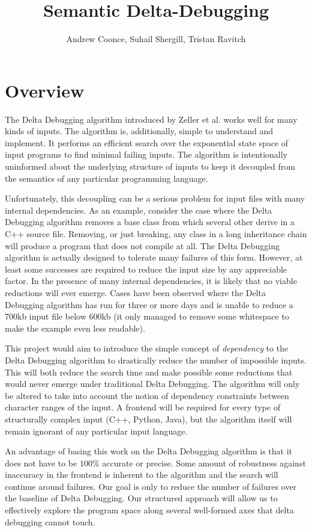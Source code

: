 \documentclass[11pt]{article}
\title{Semantic Delta-Debugging}
\author{
Andrew Coonce, Suhail Shergill, Tristan Ravitch\\
\email{\{coonce, shergill, travitch\}@cs.wisc.edu}
}
\begin{document}
\maketitle

\section{Overview}
The Delta Debugging algorithm introduced by Zeller et al. \cite{dd} works well
for many kinds of inputs. The algorithm is, additionally, simple to understand
and implement. It performs an efficient search over the exponential state space
of input programs to find minimal failing inputs. The algorithm is intentionally
uninformed about the underlying structure of inputs to keep it decoupled from
the semantics of any particular programming language.

Unfortunately, this decoupling can be a serious problem for input files with
many internal dependencies. As an example, consider the case where the Delta
Debugging algorithm removes a base class from which several other derive in a
C++ source file. Removing, or just breaking, any class in a long inheritance
chain will produce a program that does not compile at all. The Delta Debugging
algorithm is actually designed to tolerate many failures of this form. However,
at least some successes are required to reduce the input size by any appreciable
factor. In the presence of many internal dependencies, it is likely that no
viable reductions will ever emerge. Cases have been observed where the Delta
Debugging algorithm has run for three or more days and is unable to reduce a
700kb input file below 600kb (it only managed to remove some whitespace to make
the example even less readable).

This project would aim to introduce the simple concept of \emph{dependency} to the
Delta Debugging algorithm to drastically reduce the number of impossible
inputs. This will both reduce the search time and make possible some reductions
that would never emerge under traditional Delta Debugging. The algorithm will
only be altered to take into account the notion of dependency constraints
between character ranges of the input. A frontend will be required for every
type of structurally complex input (C++, Python, Java), but the algorithm itself
will remain ignorant of any particular input language.

An advantage of basing this work on the Delta Debugging algorithm is that it
does not have to be $100 \%$ accurate or precise. Some amount of robustness
against inaccuracy in the frontend is inherent to the algorithm and the search
will continue around failures. Our goal is only to reduce the number of failures
over the baseline of Delta Debugging. Our structured approach will allow us to
effectively explore the program space along several well-formed axes that delta
debugging cannot touch.
\end{document}
